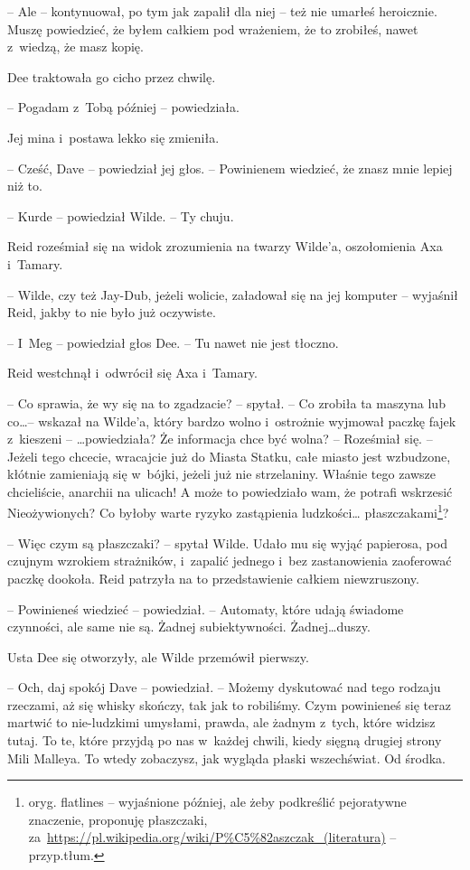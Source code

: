 \documentclass[oneside,polish,11pt,sfheadings]{mwbk}
\begin{document}
-- Ale -- kontynuował, po tym jak zapalił dla niej -- też nie umarłeś
heroicznie. Muszę powiedzieć, że byłem całkiem pod wrażeniem, że to
zrobiłeś, nawet z~wiedzą, że masz kopię.

Dee traktowała go cicho przez chwilę.

-- Pogadam z~Tobą później -- powiedziała.

Jej mina i~postawa lekko się zmieniła.

-- Cześć, Dave -- powiedział jej głos. -- Powinienem wiedzieć, że znasz
mnie lepiej niż to.

-- Kurde -- powiedział Wilde. -- Ty chuju.

Reid roześmiał się na widok zrozumienia na twarzy Wilde'a, oszołomienia
Axa i~Tamary.

-- Wilde, czy też Jay-Dub, jeżeli wolicie, załadował się na jej komputer
-- wyjaśnił Reid, jakby to nie było już oczywiste.

-- I~Meg -- powiedział głos Dee. -- Tu nawet nie jest tłoczno.

Reid westchnął i~odwrócił się Axa i~Tamary.

-- Co sprawia, że wy się na to zgadzacie? -- spytał. -- Co zrobiła ta
maszyna lub co\ldots -- wskazał na Wilde'a, który bardzo wolno i~ostrożnie
wyjmował paczkę fajek z~kieszeni -- \ldots powiedziała? Że informacja chce
być wolna? -- Roześmiał się. -- Jeżeli tego chcecie, wracajcie już do
Miasta Statku, całe miasto jest wzbudzone, kłótnie zamieniają się w~bójki, jeżeli już nie strzelaniny. Właśnie tego zawsze chcieliście,
anarchii na ulicach! A może to powiedziało wam, że potrafi wskrzesić
Nieożywionych? Co byłoby warte ryzyko zastąpienia ludzkości\ldots
płaszczakami\footnote{oryg. flatlines -- wyjaśnione później, ale żeby
podkreślić pejoratywne znaczenie, proponuję płaszczaki,
za~\url{https://pl.wikipedia.org/wiki/P\%C5\%82aszczak_(literatura)} -- przyp.tłum.}?

-- Więc czym są płaszczaki? -- spytał Wilde. Udało mu się wyjąć papierosa,
pod czujnym wzrokiem strażników, i~zapalić jednego i~bez zastanowienia
zaoferować paczkę dookoła. Reid patrzyła na to przedstawienie całkiem
niewzruszony.

-- Powinieneś wiedzieć -- powiedział. -- Automaty, które udają świadome
czynności, ale same nie są. Żadnej subiektywności. Żadnej\ldots duszy.

Usta Dee się otworzyły, ale Wilde przemówił pierwszy.

-- Och, daj spokój Dave -- powiedział. -- Możemy dyskutować nad tego
rodzaju rzeczami, aż się whisky skończy, tak jak to robiliśmy. Czym
powinieneś się teraz martwić to nie-ludzkimi umysłami, prawda, ale
żadnym z~tych, które widzisz tutaj. To te, które przyjdą po nas w~każdej
chwili, kiedy sięgną drugiej strony Mili Malleya. To wtedy zobaczysz,
jak wygląda płaski wszechświat. Od środka.
\end{document}

